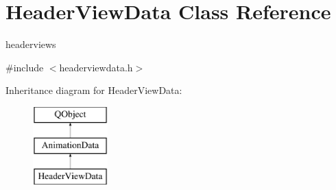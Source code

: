 \hypertarget{class_header_view_data}{}\section{Header\+View\+Data Class Reference}
\label{class_header_view_data}


headerviews  




{\ttfamily \#include $<$headerviewdata.\+h$>$}

Inheritance diagram for Header\+View\+Data\+:\begin{figure}[H]
\begin{center}
\leavevmode
\includegraphics[height=3.000000cm]{class_header_view_data}
\end{center}
\end{figure}
